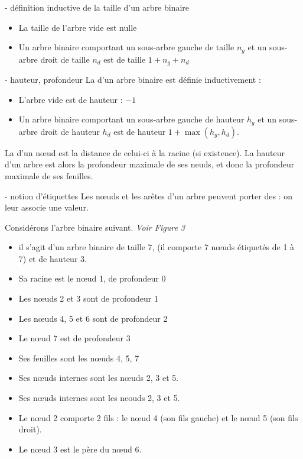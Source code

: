 \begin{remarque}{7.4}{ - définition inductive de la taille d'un arbre binaire}
    \begin{itemize}
        \item La taille de l'arbre vide est nulle
        \item Un arbre binaire comportant un sous-arbre gauche de taille $n_g$ et un sous-arbre droit de taille $n_d$ est de taille $1+n_g+n_d$ 
    \end{itemize}
    
\end{remarque}

\begin{definition}{7.5}{ - hauteur, profondeur}
    La  d'un arbre binaire est définie inductivement : \begin{itemize}
        \item L'arbre vide est de hauteur : $-1$
        \item Un arbre binaire comportant un sous-arbre gauche de hauteur $h_g$ et un sous-arbre droit de hauteur $h_d$ est de hauteur $1+\max(h_g,h_d)$.
    \end{itemize}
    La  d'un nœud est la distance de celui-ci à la racine (si existence). La hauteur d'un arbre est alors la profondeur maximale de ses neuds, et donc la profondeur maximale de ses feuilles.
\end{definition}

\begin{remarque}{7.6}{ - notion d'étiquettes}
    Les nœuds et les arêtes d'un arbre peuvent porter des  : on leur associe une valeur.
\end{remarque}

\begin{exemple}{7.7}{}
    Considérons l'arbre binaire suivant. \textit{Voir Figure 3}
    \begin{itemize}
        \item il s'agit d'un arbre binaire de taille 7, (il comporte 7 nœuds étiquetés de 1 à 7) et de hauteur 3.
        \item Sa racine est le nœud 1, de profondeur 0
        \item Les nœuds 2 et 3 sont de profondeur 1
        \item Les nœuds 4, 5 et 6 sont de profondeur 2
        \item Le nœud 7 est de profondeur 3
        \item Ses feuilles sont les nœuds 4, 5, 7
        \item Ses nœuds internes sont les nœuds 2, 3 et 5.
        \item Ses nœuds internes sont les neouds 2, 3 et 5.
        \item Le nœud 2 comporte 2 fils : le nœud 4 (son fils gauche) et le nœud 5 (son fils droit).
        \item Le nœud 3 est le père du nœud 6.
    \end{itemize}
\end{exemple}

